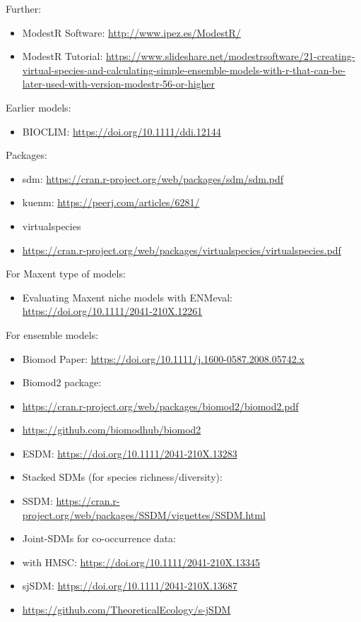 \documentclass[
]{book}
\providecommand{\tightlist}{%
  \setlength{\itemsep}{0pt}\setlength{\parskip}{0pt}}
\begin{document}
Further:

\begin{itemize}
\item
  ModestR Software: \url{http://www.ipez.es/ModestR/}
\item
  ModestR Tutorial:
  \url{https://www.slideshare.net/modestrsoftware/21-creating-virtual-species-and-calculating-simple-ensemble-models-with-r-that-can-be-later-used-with-version-modestr-56-or-higher}
\end{itemize}

Earlier models:

\begin{itemize}
\tightlist
\item
  BIOCLIM: \url{https://doi.org/10.1111/ddi.12144}
\end{itemize}

Packages:

\begin{itemize}
\item
  sdm: \url{https://cran.r-project.org/web/packages/sdm/sdm.pdf}
\item
  kuenm: \url{https://peerj.com/articles/6281/}
\item
  virtualspecies \citep{leroy2015}
\item
  \url{https://cran.r-project.org/web/packages/virtualspecies/virtualspecies.pdf}
\end{itemize}

For Maxent type of models:

\begin{itemize}
\tightlist
\item
  Evaluating Maxent niche models with ENMeval:
  \url{https://doi.org/10.1111/2041-210X.12261}
\end{itemize}

For ensemble models:

\begin{itemize}
\item
  Biomod Paper: \url{https://doi.org/10.1111/j.1600-0587.2008.05742.x}
\item
  Biomod2 package:
\item
  \url{https://cran.r-project.org/web/packages/biomod2/biomod2.pdf}
\item
  \url{https://github.com/biomodhub/biomod2}
\item
  ESDM: \url{https://doi.org/10.1111/2041-210X.13283}
\item
  Stacked SDMs (for species richness/diversity):
\item
  SSDM:
  \url{https://cran.r-project.org/web/packages/SSDM/vignettes/SSDM.html}
\item
  Joint-SDMs for co-occurrence data:
\item
  with HMSC: \url{https://doi.org/10.1111/2041-210X.13345}
\item
  sjSDM: \url{https://doi.org/10.1111/2041-210X.13687}
\item
  \url{https://github.com/TheoreticalEcology/s-jSDM}
\end{itemize}
\end{document}
